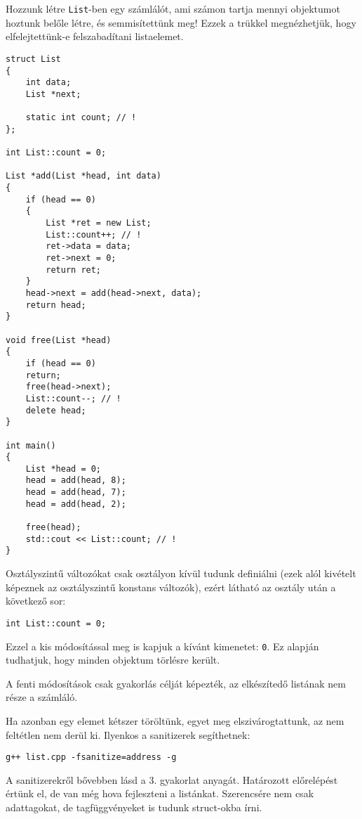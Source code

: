 \documentclass[a4paper,11.5pt,table]{article}
\begin{document}
	Hozzunk létre \texttt{List}-ben egy számlálót, ami számon tartja mennyi objektumot hoztunk belőle létre, és semmisítettünk meg! Ezzek a trükkel megnézhetjük, hogy elfelejtettünk-e felszabadítani listaelemet.
	\begin{lstlisting}
struct List
{
	int data;
	List *next;
	
	static int count; // !
};

int List::count = 0;

List *add(List *head, int data)
{
	if (head == 0)
	{
		List *ret = new List;
	    List::count++; // !
		ret->data = data;
		ret->next = 0;
		return ret;
	}
	head->next = add(head->next, data);
	return head;
}

void free(List *head)
{
	if (head == 0)
	return;
	free(head->next);
	List::count--; // !
	delete head;
}

int main()
{
	List *head = 0;
	head = add(head, 8);
	head = add(head, 7);
	head = add(head, 2);
	
	free(head);
	std::cout << List::count; // !
}
	\end{lstlisting}
	
	Osztályszintű változókat csak osztályon kívül tudunk definiálni (ezek alól kivételt képeznek az osztályszintű konstans változók), ezért látható az osztály után a következő sor:
	\begin{lstlisting}
int List::count = 0;
	\end{lstlisting}
	
	Ezzel a kis módosítással meg is kapjuk a kívánt kimenetet: \texttt{0}. Ez alapján tudhatjuk, hogy minden objektum törlésre került.
	\begin{note}
		A fenti módosítások csak gyakorlás célját képezték, az elkészítedő listának nem része a számláló.
	\end{note}
	Ha azonban egy elemet kétszer töröltünk, egyet meg elszivárogtattunk, az nem feltétlen nem derül ki. Ilyenkos a sanitizerek segíthetnek:
	\begin{center}
		\texttt{g++ list.cpp -fsanitize=address -g}
	\end{center}
  A sanitizerekről bővebben lásd a 3. gyakorlat anyagát.
	\medskip
	Határozott előrelépést értünk el, de van még hova fejleszteni a listánkat. Szerencsére nem csak adattagokat, de tagfüggvényeket is tudunk struct-okba írni.
\end{document}
